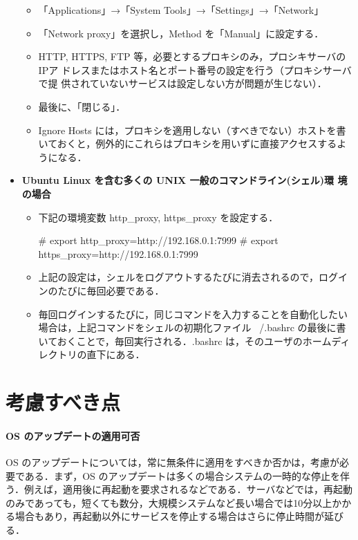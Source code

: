 \begin{itemize}
\begin{itemize}
 \item 「Applications」→「System Tools」→「Settings」→「Network」
 \item 「Network proxy」を選択し，Method を「Manual」に設定する．
 \item HTTP, HTTPS, FTP 等，必要とするプロキシのみ，プロシキサーバのIPア
       ドレスまたはホスト名とポート番号の設定を行う（プロキシサーバで提
       供されていないサービスは設定しない方が問題が生じない）．
 \item 最後に、「閉じる」．
 \item Ignore Hosts には，プロキシを適用しない（すべきでない）ホストを書
       いておくと，例外的にこれらはプロキシを用いずに直接アクセスするようになる．
\end{itemize}

\item{\bf Ubuntu Linux を含む多くの UNIX 一般のコマンドライン(シェル)環
     境の場合}\\

\begin{itemize}
 \item 下記の環境変数 http\_proxy, https\_proxy を設定する．
\begin{cli}
# export http_proxy=http://192.168.0.1:7999
# export https_proxy=http://192.168.0.1:7999
\end{cli}
 \item 上記の設定は，シェルをログアウトするたびに消去されるので，ログイ
       ンのたびに毎回必要である．
 \item 毎回ログインするたびに，同じコマンドを入力することを自動化したい
       場合は，上記コマンドをシェルの初期化ファイル ~/.bashrc の最後に書
       いておくことで，毎回実行される．.bashrc は，そのユーザのホームディ
       レクトリの直下にある．
\end{itemize}
\end{itemize}


\section{考慮すべき点}
\paragraph{OS のアップデートの適用可否}

OS のアップデートについては，常に無条件に適用をすべきか否かは，考慮が必
要である．まず，OS のアップデートは多くの場合システムの一時的な停止を伴
う．例えば，適用後に再起動を要求されるなどである．サーバなどでは，再起動
のみであっても，短くても数分，大規模システムなど長い場合では10分以上かか
る場合もあり，再起動以外にサービスを停止する場合はさらに停止時間が延びる．

